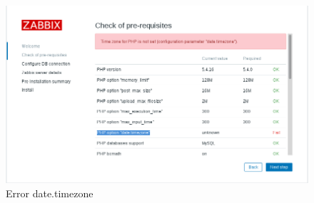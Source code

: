 \documentclass[12pt,a4paper]{article}
\begin{document}
		\begin{figure}[h]
			\centering
			\includegraphics[width=1.0\textwidth]{images/timezone.png}
			\caption{Error date.timezone}
		\end{figure}
	
\end{document}
